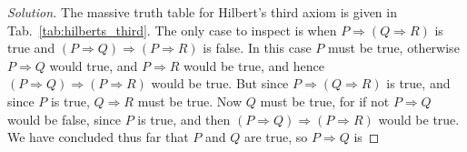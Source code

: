 \documentclass{article}
\theoremstyle{normal}
\begin{document}
\begin{proof}[Solution]
        \begin{table}
            \centering
            \caption{Truth Table for Hilbert's Third Axiom}
            \label{tab:hilberts_third}
        \end{table}
        The massive truth table for Hilbert's third axiom is given in
        Tab.~\ref{tab:hilberts_third}. The only case to inspect is when
        $P\Rightarrow(Q\Rightarrow{R})$ is true and
        $(P\Rightarrow{Q})\Rightarrow(P\Rightarrow{R})$ is false. In this case
        $P$ must be true, otherwise $P\Rightarrow{Q}$ would true, and
        $P\Rightarrow{R}$ would be true, and hence
        $(P\Rightarrow{Q})\Rightarrow(P\Rightarrow{R})$ would be true. But
        since $P\Rightarrow(Q\Rightarrow{R})$ is true, and since $P$ is true,
        $Q\Rightarrow{R}$ must be true. Now $Q$ must be true, for if not
        $P\Rightarrow{Q}$ would be false, since $P$ is true, and then
        $(P\Rightarrow{Q})\Rightarrow(P\Rightarrow{R})$ would be true. We have
        concluded thus far that $P$ and $Q$ are true, so $P\Rightarrow{Q}$ is

\end{proof}
\end{document}
